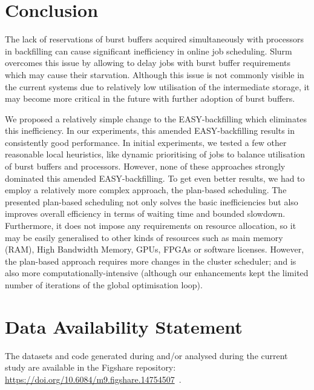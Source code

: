 \documentclass[runningheads]{llncs}
\begin{document}


\section{Conclusion} \label{sec:conclusion}
The lack of reservations of burst buffers acquired simultaneously with processors in backfilling can cause significant inefficiency in online job scheduling. Slurm overcomes this issue by allowing to delay jobs with burst buffer requirements which may cause their starvation. Although this issue is not commonly visible in the current systems due to relatively low utilisation of the intermediate storage, it may become more critical in the future with further adoption of burst buffers. 

We proposed a relatively simple change to the EASY-backfilling which eliminates this inefficiency. 
In our experiments, this amended EASY-backfilling results in consistently good performance. In initial experiments, we tested a few other reasonable local heuristics, like dynamic prioritising of jobs to balance utilisation of burst buffers and processors. However, none of these approaches strongly dominated this amended EASY-backfilling. To get even better results, we had to employ a relatively more complex approach, the plan-based scheduling.
The presented plan-based scheduling not only solves the basic inefficiencies but also improves overall efficiency in terms of waiting time and bounded slowdown. Furthermore, it does not impose any requirements on resource allocation, so it may be easily generalised to other kinds of resources such as main memory (RAM), High Bandwidth Memory, GPUs, FPGAs or software licenses. However, the plan-based approach requires more changes in the cluster scheduler; and is also more computationally-intensive (although our enhancements kept the limited number of iterations of the global optimisation loop).

\section*{Data Availability Statement}
The datasets and code generated during and/or analysed during the current study are available in the Figshare repository: \url{https://doi.org/10.6084/m9.figshare.14754507}~\cite{artifact}.
\end{document}
